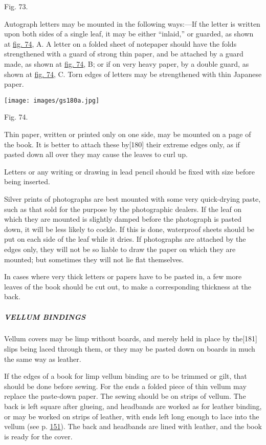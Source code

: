 \documentclass[
]{article}
\begin{document}
Fig. 73.

Autograph letters may be mounted in the following ways:---If the letter
is written upon both sides of a single leaf, it may be either
``inlaid,'' or guarded, as shown at \protect\hyperlink{Fig_74}{fig. 74},
A. A letter on a folded sheet of notepaper should have the folds
strengthened with a guard of strong thin paper, and be attached by a
guard made, as shown at \protect\hyperlink{Fig_74}{fig. 74}, B; or if on
very heavy paper, by a double guard, as shown at
\protect\hyperlink{Fig_74}{fig. 74}, C. Torn edges of letters may be
strengthened with thin Japanese paper.

\protect\hypertarget{Fig_74}{}{}
\texttt{[image: images/gs180a.jpg]}

Fig. 74.

Thin paper, written or printed only on one side, may be mounted on a
page of the book. It is better to attach these
by{\protect\hypertarget{Page_180}{}{{[}180{]}}} their extreme edges
only, as if pasted down all over they may cause the leaves to curl up.

Letters or any writing or drawing in lead pencil should be fixed with
size before being inserted.

Silver prints of photographs are best mounted with some very
quick-drying paste, such as that sold for the purpose by the
photographic dealers. If the leaf on which they are mounted is slightly
damped before the photograph is pasted down, it will be less likely to
cockle. If this is done, waterproof sheets should be put on each side of
the leaf while it dries. If photographs are attached by the edges only,
they will not be so liable to draw the paper on which they are mounted;
but sometimes they will not lie flat themselves.

In cases where very thick letters or papers have to be pasted in, a few
more leaves of the book should be cut out, to make a corresponding
thickness at the back.

\hypertarget{vellum-bindings}{%
\subparagraph{VELLUM BINDINGS}\label{vellum-bindings}}

Vellum covers may be limp without boards, and merely held in place by
the{\protect\hypertarget{Page_181}{}{{[}181{]}}} slips being laced
through them, or they may be pasted down on boards in much the same way
as leather.

If the edges of a book for limp vellum binding are to be trimmed or
gilt, that should be done before sewing. For the ends a folded piece of
thin vellum may replace the paste-down paper. The sewing should be on
strips of vellum. The back is left square after glueing, and headbands
are worked as for leather binding, or may be worked on strips of
leather, with ends left long enough to lace into the vellum (see p.
\protect\hyperlink{Page_151}{151}). The back and headbands are lined
with leather, and the book is ready for the cover.
\end{document}
